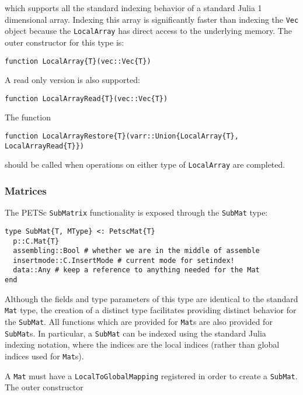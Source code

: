 \documentclass{article}
\begin{document}
\noindent which supports all the standard indexing behavior of a standard Julia 
1 dimensional array.  Indexing this array is significantly faster than 
indexing the \texttt{Vec} object because the \texttt{LocalArray} has direct
access to the underlying memory.
The outer constructor for this type is:

\begin{verbatim}
function LocalArray{T}(vec::Vec{T})
\end{verbatim}

\noindent A read only version is also supported:

\begin{verbatim}
function LocalArrayRead{T}(vec::Vec{T})
\end{verbatim}

\noindent The function 
\begin{verbatim}
function LocalArrayRestore{T}(varr::Union{LocalArray{T}, LocalArrayRead{T}})
\end{verbatim}

\noindent should be called when operations on either type of \texttt{LocalArray} are 
completed.

\subsubsection{Matrices}
The PETSc \texttt{SubMatrix} functionality is exposed through the 
\texttt{SubMat} type:
\begin{verbatim}
type SubMat{T, MType} <: PetscMat{T}
  p::C.Mat{T}
  assembling::Bool # whether we are in the middle of assemble
  insertmode::C.InsertMode # current mode for setindex!
  data::Any # keep a reference to anything needed for the Mat
end

\end{verbatim}

\noindent Although the fields and type parameters of this type are identical to the
standard \texttt{Mat} type, the creation of a distinct type facilitates
providing distinct behavior for the \texttt{SubMat}.  All functions which
are provided for \texttt{Mat}s are also provided for \texttt{SubMat}s.
In particular, a \texttt{SubMat} can be indexed using the standard Julia
indexing notation, where the indices are the local indices (rather than global
indices used for \texttt{Mat}s).

A \texttt{Mat} must have a \texttt{LocalToGlobalMapping} registered in order
to create a \texttt{SubMat}.  The outer constructor
\end{document}
